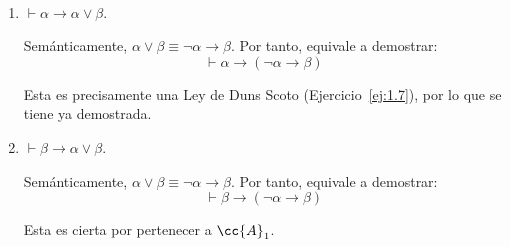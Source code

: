 \begin{ejercicio}\label{ej:1.19}~
    \begin{enumerate}
        \item $\vdash \alpha \rightarrow \alpha \lor \beta$.
        
        Semánticamente, $\alpha\lor\beta \equiv \neg\alpha\rightarrow\beta$. Por tanto, equivale a demostrar:
        \begin{equation*}
            \vdash \alpha\rightarrow(\neg\alpha\rightarrow\beta)
        \end{equation*}

        Esta es precisamente una Ley de Duns Scoto (Ejercicio~\ref{ej:1.7}), por lo que se tiene ya demostrada.
        \item $\vdash \beta \rightarrow \alpha \lor \beta$.
        
        Semánticamente, $\alpha\lor\beta \equiv \neg\alpha\rightarrow\beta$. Por tanto, equivale a demostrar:
        \begin{equation*}
            \vdash \beta\rightarrow(\neg\alpha\rightarrow\beta)
        \end{equation*}

        Esta es cierta por pertenecer a $\cc{A}_1$.
    \end{enumerate}
\end{ejercicio}

